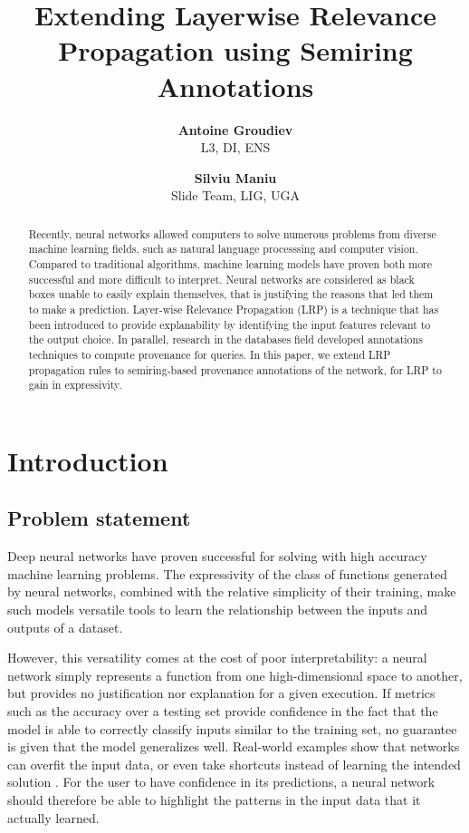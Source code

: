 \documentclass{../cs-classes/cs-classes}
\title{Extending Layerwise Relevance Propagation using Semiring Annotations}
\author{
    \textbf{Antoine Groudiev}\\L3, DI, ENS
    \and
    \textbf{Silviu Maniu}\\Slide Team, LIG, UGA
}
\begin{document}
\begin{abstract}
    Recently, neural networks allowed computers to solve numerous problems from diverse machine learning fields, such as natural language processsing and computer vision. Compared to traditional algorithms, machine learning models have proven both more successful and more difficult to interpret. Neural networks are considered as black boxes unable to easily explain themselves, that is justifying the reasons that led them to make a prediction. Layer-wise Relevance Propagation (LRP) is a technique that has been introduced to provide explanability by identifying the input features relevant to the output choice. In parallel, research in the databases field developed annotations techniques to compute provenance for queries. In this paper, we extend LRP propagation rules to semiring-based provenance annotations of the network, for LRP to gain in expressivity.
\end{abstract}

\section{Introduction}
\subsection{Problem statement}
Deep neural networks have proven successful for solving with high accuracy machine learning problems. The expressivity of the class of functions generated by neural networks, combined with the relative simplicity of their training, make such models versatile tools to learn the relationship between the inputs and outputs of a dataset.

However, this versatility comes at the cost of poor interpretability: a neural network simply represents a function from one high-dimensional space to another, but provides no justification nor explanation for a given execution. If metrics such as the accuracy over a testing set provide confidence in the fact that the model is able to correctly classify inputs similar to the training set, no guarantee is given that the model generalizes well. Real-world examples show that networks can overfit the input data, or even take shortcuts instead of learning the intended solution \cite{shortcuts}. For the user to have confidence in its predictions, a neural network should therefore be able to highlight the patterns in the input data that it actually learned.
\end{document}
